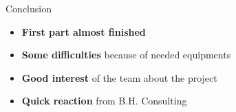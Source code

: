 \documentclass[12pt]{beamer}
\begin{document}
\begin{frame}{Conclusion}
    \begin{itemize}
	\item \textbf{First part almost finished}
	\vfill
	\item \textbf{Some difficulties} because of needed equipments
	\vfill
	\item \textbf{Good interest} of the team about the project
	\vfill
	\item \textbf{Quick reaction} from B.H. Consulting
    \end{itemize}
\end{frame}
\end{document}

